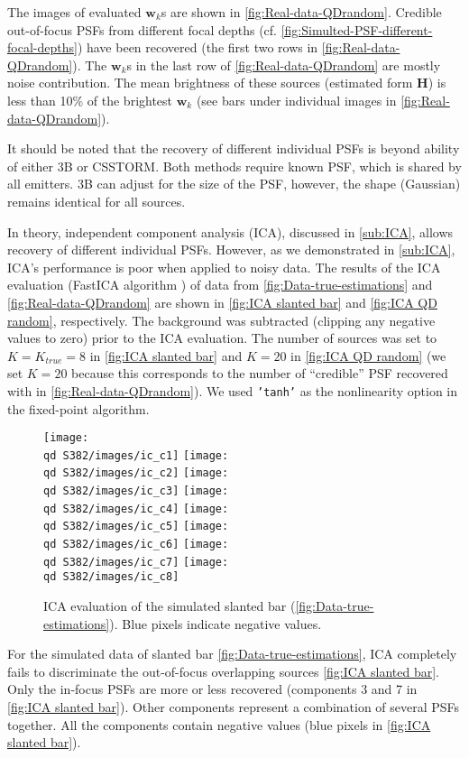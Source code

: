 The images of evaluated $\bm{w}_k$s are shown in \autoref{fig:Real-data-QDrandom}\aaa. Credible out-of-focus PSFs from different focal depths (cf. \autoref{fig:Simulted-PSF-different-focal-depths}) have been recovered (the first two rows in \autoref{fig:Real-data-QDrandom}\bbb). The $\bm{w}_k$s in the last row of \autoref{fig:Real-data-QDrandom}\bbb{} are mostly noise contribution. The mean brightness of these sources (estimated form $\bm{H}$) is less than 10\% of the brightest $\bm{w}_k$ (see bars under individual images in \autoref{fig:Real-data-QDrandom}\bbb).

It should be noted that the recovery of different individual PSFs is beyond ability of either 3B or CSSTORM. Both methods require known PSF, which is shared by all emitters. 3B can adjust for the size of the PSF, however, the shape (Gaussian)  remains identical for all sources. 

In theory, independent component analysis (ICA), discussed in \autoref{sub:ICA}, allows recovery of different individual PSFs. However, as we demonstrated in \autoref{sub:ICA}, ICA's performance is poor when applied to noisy data. The results of the ICA evaluation (FastICA algorithm \cite{Hyvarinen2000}) of data from \autoref{fig:Data-true-estimations} and \autoref{fig:Real-data-QDrandom} are shown in \autoref{fig:ICA slanted bar} and \autoref{fig:ICA QD random}, respectively. The background was subtracted (clipping any negative values to zero) prior to the ICA evaluation. The number of sources was set to $K=K_{true}=8$ in \autoref{fig:ICA slanted bar} and $K=20$ in \autoref{fig:ICA QD random} (we set $K=20$ because this corresponds to the number of ``credible'' PSF recovered with \inmf{} in \autoref{fig:Real-data-QDrandom}\bbb). We used {\tt 'tanh'} as the nonlinearity option in the fixed-point algorithm.

\begin{figure}[!tb]
	\newcommand{\wf}{.22}
	\newcommand{\barspace}{-.6cm}	
	\centering
	\texttt{[image: \\qd S382/images/ic\_c1]}
	\texttt{[image: \\qd S382/images/ic\_c2]}
	\texttt{[image: \\qd S382/images/ic\_c3]}
	\texttt{[image: \\qd S382/images/ic\_c4]}
	\texttt{[image: \\qd S382/images/ic\_c5]}
	\texttt{[image: \\qd S382/images/ic\_c6]}
	\texttt{[image: \\qd S382/images/ic\_c7]}
	\texttt{[image: \\qd S382/images/ic\_c8]}
	\caption{ICA evaluation of the simulated slanted bar (\autoref{fig:Data-true-estimations}). Blue pixels indicate negative values.}
	\label{fig:ICA slanted bar}
\end{figure}
%
For the simulated data of slanted bar \autoref{fig:Data-true-estimations}\aaa, ICA completely fails to discriminate the out-of-focus overlapping sources \autoref{fig:ICA slanted bar}. Only the in-focus PSFs are more or less recovered (components 3 and 7 in \autoref{fig:ICA slanted bar}). Other components represent  a combination of several PSFs together. All the components contain negative values (blue pixels in \autoref{fig:ICA slanted bar}).

